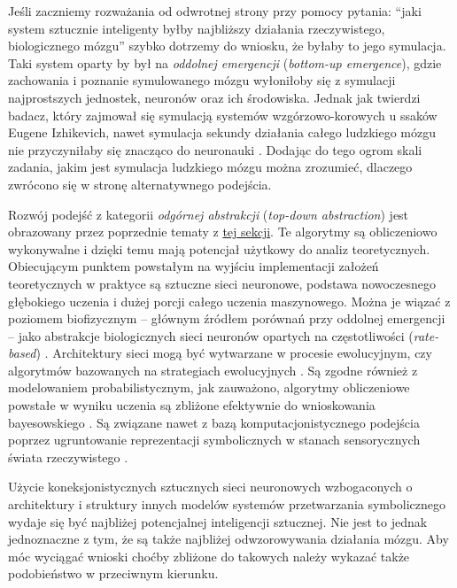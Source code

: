 Jeśli zaczniemy rozważania od odwrotnej strony przy pomocy pytania: ``jaki system sztucznie inteligenty byłby najbliższy działania rzeczywistego, biologicznego mózgu'' szybko dotrzemy do wniosku, że byłaby to jego symulacja.
Taki system oparty by był na \emph{oddolnej emergencji} (\emph{bottom-up emergence}), gdzie zachowania i poznanie symulowanego mózgu wyłoniłoby się z symulacji najprostszych jednostek, neuronów oraz ich środowiska.
Jednak jak twierdzi badacz, który zajmował się symulacją systemów wzgórzowo-korowych u ssaków \cite{izhikevich2008large} Eugene Izhikevich, nawet symulacja sekundy działania całego ludzkiego mózgu nie przyczyniłaby się znacząco do neuronauki \cite{Izhikevich2006why}.
Dodając do tego ogrom skali zadania, jakim jest symulacja ludzkiego mózgu można zrozumieć, dlaczego zwrócono się w stronę alternatywnego podejścia.

Rozwój podejść z kategorii \emph{odgórnej abstrakcji} (\emph{top-down abstraction}) jest obrazowany przez poprzednie tematy z \hyperref[cognitive-basics]{tej sekcji}.
Te algorytmy są obliczeniowo wykonywalne i dzięki temu mają potencjał użytkowy do analiz teoretycznych.
Obiecującym punktem powstałym na wyjściu implementacji założeń teoretycznych w praktyce są sztuczne sieci neuronowe, podstawa nowoczesnego głębokiego uczenia i dużej porcji całego uczenia maszynowego.
Można je wiązać z poziomem biofizycznym -- głównym źródłem porównań przy oddolnej emergencji -- jako abstrakcje biologicznych sieci neuronów opartych na częstotliwości (\emph{rate-based}) \cite{dayan2001theoretical}.
Architektury sieci mogą być wytwarzane w procesie ewolucyjnym, czy algorytmów bazowanych na strategiach ewolucyjnych \cite{real2017large}.
Są zgodne również z modelowaniem probabilistycznym, jak zauważono, algorytmy obliczeniowe powstałe w wyniku uczenia są zbliżone efektywnie do wnioskowania bayesowskiego \cite{gal2016dropout, mandt2017stochastic}.
Są związane nawet z bazą komputacjonistycznego podejścia poprzez ugruntowanie reprezentacji symbolicznych w stanach sensorycznych świata rzeczywistego \cite{harnad1990symbol}.

Użycie koneksjonistycznych sztucznych sieci neuronowych wzbogaconych o architektury i struktury innych modelów systemów przetwarzania symbolicznego wydaje się być najbliżej potencjalnej inteligencji sztucznej.
Nie jest to jednak jednoznaczne z tym, że są także najbliżej odwzorowywania działania mózgu.
Aby móc wyciągać wnioski choćby zbliżone do takowych należy wykazać także podobieństwo w przeciwnym kierunku.

